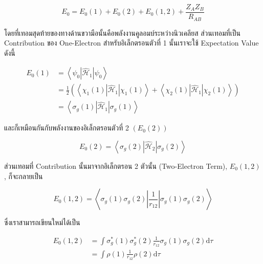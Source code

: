\begin{equation}
    \label{eq:Energy_hydrogen_molecule}
    E_0 = E_0(1) + E_0(2) + E_0(1,2) + \frac{Z_A Z_B}{R_{A B}}
\end{equation}

\noindent โดยที่เทอมสุดท้ายของทางด้านขวามือนั้นคือพลังงานคูลอมบ์ระหว่างนิวเคลียส ส่วนเทอมที่เป็น Contribution ของ One-Electron
สำหรับอิเล็กตรอนตัวที่ 1 นั้นเราจะใช้ Expectation Value ดังนี้

\begin{equation}
    \begin{aligned}
        E_0(1)
         & = \left\langle\psi_0\left|\hat{\mathscr{H}}_1\right| \psi_0\right\rangle \\
         & = \frac{1}{2}
        \left(
        \left\langle
        \chi_1(1)\left|\hat{\mathscr{H}}_1\right| \chi_1(1)
        \right\rangle
        + \left\langle
        \chi_2(1)\left|\hat{\mathscr{H}}_1\right| \chi_2(1)
        \right\rangle
        \right)                                                                     \\
         & = \left\langle
        \sigma_g(1)\left|\hat{\mathscr{H}}_1\right| \sigma_g(1)
        \right\rangle
    \end{aligned}
\end{equation}

\noindent และก็เหมือนกันกับพลังงานของอิเล็กตรอนตัวที่ 2 $(E_0(2))$

\begin{equation}
    E_0(2)
    =
    \left\langle
    \sigma_g(2)
    \left| \hat{\mathscr{H}}_2 \right|
    \sigma_g(2)
    \right\rangle
\end{equation}

ส่วนเทอมที่ Contribution นั้นมาจากอิเล็กตรอน 2 ตัวนั้น (Two-Electron Term), $E_0(1,2)$, ก็จะกลายเป็น

\begin{equation}
    \label{eq:energy_one_electron_ground_state}
    E_0(1,2)
    =
    \left\langle
    \sigma_g(1) \sigma_g(2)\left|\frac{1}{r_{12}}\right| \sigma_g(1) \sigma_g(2)
    \right\rangle
\end{equation}

\noindent ซึ่งเราสามารถเขียนใหม่ได้เป็น

\begin{equation}
    \label{eq:energy_two_electron_ground_state}
    \begin{aligned}
        E_0(1,2)
         & = \int \sigma_g^*(1) \sigma_g^*(2) \frac{1}{r_{12}} \sigma_g(1) \sigma_g(2) \mathrm{d} \tau \\
         & = \int \rho(1) \frac{1}{r_{12}} \rho(2) \mathrm{d} \tau
    \end{aligned}
\end{equation}

